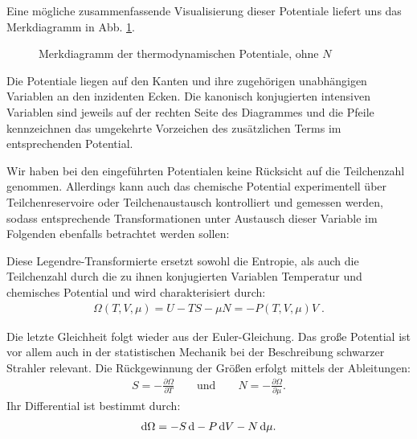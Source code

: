 Eine mögliche zusammenfassende Visualisierung dieser Potentiale liefert uns das Merkdiagramm in Abb. \ref{fig:TDPotentialeMerk}.
\begin{figure}[htbp]
    \centering
    \tfigTDPotentialeMerk
    \caption{Merkdiagramm der thermodynamischen Potentiale, ohne $N$}
    \label{fig:TDPotentialeMerk}
\end{figure}
Die Potentiale liegen auf den Kanten und ihre zugehörigen unabhängigen Variablen an den inzidenten Ecken. Die kanonisch konjugierten intensiven Variablen sind jeweils auf der rechten Seite des Diagrammes und die Pfeile kennzeichnen das umgekehrte Vorzeichen des zusätzlichen Terms im entsprechenden Potential. 

Wir haben bei den eingeführten Potentialen keine Rücksicht auf die Teilchenzahl genommen.
Allerdings kann auch das chemische Potential experimentell über Teilchenreservoire oder Teilchenaustausch kontrolliert und gemessen werden, sodass entsprechende Transformationen unter Austausch dieser Variable im Folgenden ebenfalls betrachtet werden sollen:

\begin{formal}

    Diese Legendre-Transformierte ersetzt sowohl die Entropie, als auch die Teilchenzahl durch die zu ihnen konjugierten Variablen Temperatur und chemisches Potential und wird charakterisiert durch:
    \begin{align*}
        \boxed{\Omega (T,V,\mu)=U-TS-\mu N=-P(T,V,\mu)V}\;.
    \end{align*}
\end{formal}
Die letzte Gleichheit folgt wieder aus der Euler-Gleichung. Das große Potential ist vor allem auch in der statistischen Mechanik bei der Beschreibung schwarzer Strahler relevant. Die Rückgewinnung der Größen erfolgt mittels der Ableitungen:
    \begin{align*}
        S=-\frac{\partial \Omega}{\partial T}\qquad \mathrm{und}\qquad N=-\frac{\partial \Omega}{\partial \mu}.
    \end{align*}
    Ihr Differential ist bestimmt durch:
    \begin{align*}
        \mathop{}\!\mathrm{d} \Omega=-S\mathop{}\!\mathrm{d} -P\mathop{}\!\mathrm{d} V-N \mathop{}\!\mathrm{d} \mu.
    \end{align*}

